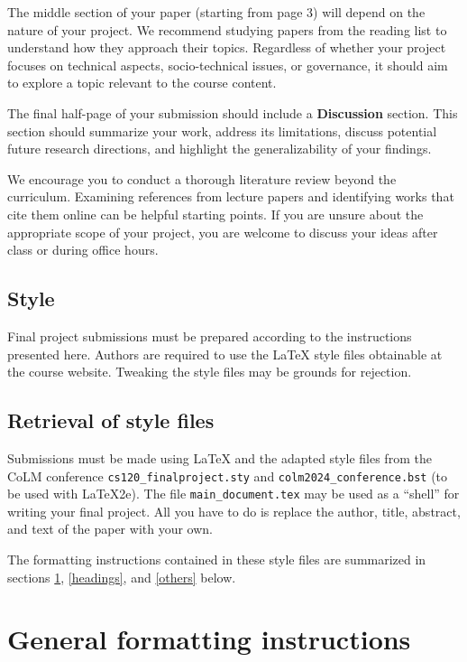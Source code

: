 \documentclass{article} %
\begin{document}
The middle section of your paper (starting from page 3) will depend on the nature of your project. We recommend studying papers from the reading list to understand how they approach their topics. Regardless of whether your project focuses on technical aspects, socio-technical issues, or governance, it should aim to explore a topic relevant to the course content.

The final half-page of your submission should include a \textbf{Discussion} section. This section should summarize your work, address its limitations, discuss potential future research directions, and highlight the generalizability of your findings.

We encourage you to conduct a thorough literature review beyond the curriculum. Examining references from lecture papers and identifying works that cite them online can be helpful starting points. If you are unsure about the appropriate scope of your project, you are welcome to discuss your ideas after class or during office hours.

\subsection{Style}

Final project submissions must be prepared according to the instructions presented here.
Authors are required to use the \LaTeX{} style files obtainable at the course website. Tweaking the style files may be grounds for rejection.

\subsection{Retrieval of style files}

Submissions must be made using \LaTeX{} and the adapted style files from the CoLM conference
\verb+cs120_finalproject.sty+ and \verb+colm2024_conference.bst+ (to be used with \LaTeX{}2e). The file
\verb+main_document.tex+ may be used as a ``shell'' for writing your final project. All you have to do is replace the author, title, abstract, and text of the paper with your own.

The formatting instructions contained in these style files are summarized in sections \ref{gen_inst}, \ref{headings}, and \ref{others} below.

\section{General formatting instructions}
\label{gen_inst}
\end{document}
